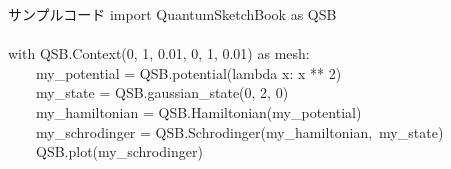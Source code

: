 \documentclass[a4paper, lualatex]{bxjsarticle}
\begin{document}
\begin{section}{サンプルコード}
    import QuantumSketchBook as QSB\\\\
        with QSB.Context(0, 1, 0.01, 0, 1, 0.01) as mesh:\\
        \ \ \ \  my\_potential = QSB.potential(lambda x: x ** 2)\\
        \ \ \ \  my\_state = QSB.gaussian\_state(0, 2, 0)\\
        \ \ \ \  my\_hamiltonian = QSB.Hamiltonian(my\_potential)\\
        \ \ \ \  my\_schrodinger = QSB.Schrodinger(my\_hamiltonian,\  my\_state)\\
        \ \ \ \  QSB.plot(my\_schrodinger)
\end{section}
\end{document}
